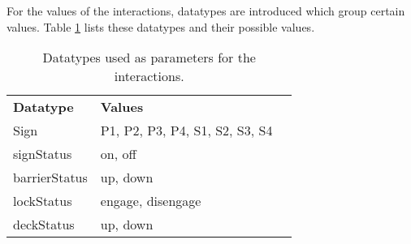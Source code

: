 For the values of the interactions, datatypes are introduced which group certain values. Table \ref{tab:types} lists these datatypes and their possible values.

\begin{table}[htb]%
\begin{tabular}{lll}
	\textbf{Datatype} & \textbf{Values}\\
	Sign & P1, P2, P3, P4, S1, S2, S3, S4\\
	signStatus & on, off\\
	barrierStatus & up, down\\
	lockStatus & engage, disengage\\
	deckStatus & up, down\\
\end{tabular}
\caption{Datatypes used as parameters for the interactions.}
\label{tab:types}
\end{table}